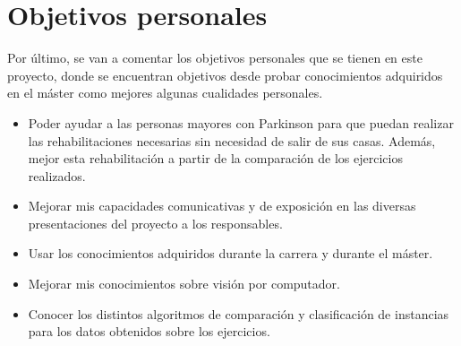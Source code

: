 \section{Objetivos personales}
Por último, se van a comentar los objetivos personales que se tienen en este proyecto, donde se encuentran objetivos desde probar conocimientos adquiridos en el máster como mejores algunas cualidades personales.
\begin{itemize}
	\item Poder ayudar a las personas mayores con Parkinson para que puedan realizar las rehabilitaciones necesarias sin necesidad de salir de sus casas. Además, mejor esta rehabilitación a partir de la comparación de los ejercicios realizados.
	\item Mejorar mis capacidades comunicativas y de exposición en las diversas presentaciones del proyecto a los responsables.
	\item Usar los conocimientos adquiridos durante la carrera y durante el máster.
	\item Mejorar mis conocimientos sobre visión por computador.
	\item Conocer los distintos algoritmos de comparación y clasificación de instancias para los datos obtenidos sobre los ejercicios.
\end{itemize} 

